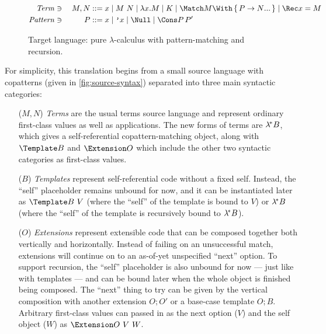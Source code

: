 \begin{figure}[t]
\centering
\begin{alignat*}{2}
  \mathit{Term} &\ni{}& M, N
  &::= x
  \mid M ~ N
  \mid \lambda x. M
  \mid K
  \mid \Match M \With \set{\many{P \to N}}
  \mid \Rec x = M
  \\
  \mathit{Pattern} &\ni{}& P
  &::= x
  \mid \q{x}
  \mid \Null
  \mid \Cons P \, P'
\end{alignat*}

\caption{Target language: pure $\lambda$-calculus with pattern-matching and recursion.}
\label{fig:target-syntax}
\end{figure}

For simplicity, this translation begins from a small source language with copatterns (given in \cref{fig:source-syntax}) separated into three main syntactic categories:
\begin{itemize}
\item[($M, N$)] \emph{Terms} are the usual terms source language and represent ordinary first-class values as well as applications.
  The new forms of terms are $\lambda^{\!*} B$, which gives a self-referential copattern-matching object, along with $\Template B$ and $\Extension O$ which include the other two syntactic categories as first-class values.
\item[($B$)] \emph{Templates} represent self-referential code without a fixed self.
  Instead, the ``self'' placeholder remains unbound for now, and it can be instantiated later as $\Template B ~ V$ (where the ``self'' of the template is bound to $V$) or $\lambda^{\!*} B$ (where the ``self'' of the template is recursively bound to $\lambda^{\!*} B$).
\item[($O$)] \emph{Extensions} represent extensible code that can be composed together both vertically and horizontally.
  Instead of failing on an unsuccessful match, extensions will continue on to an as-of-yet unspecified ``next'' option.
  To support recursion, the ``self'' placeholder is also unbound for now --- just like with templates --- and can be bound later when the whole object is finished being composed.
  The ``next'' thing to try can be given by the vertical composition with another extension $O; O'$ or a base-case template $O; B$.
  Arbitrary first-class values can passed in as the next option ($V$) and the self object ($W$) as $\Extension O ~ V ~ W$.
\end{itemize}


